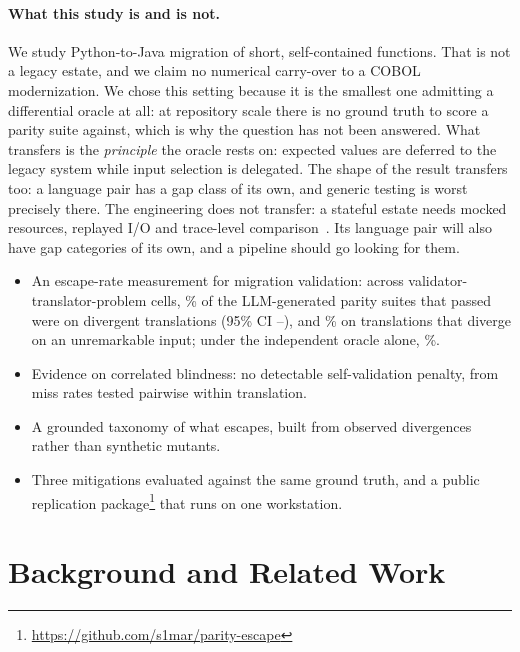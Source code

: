 \documentclass[sigconf]{acmart}
\begin{document}
\paragraph{What this study is and is not.}
We study Python-to-Java migration of short, self-contained functions. That is not a legacy
estate, and we claim no numerical carry-over to a COBOL modernization. We chose this setting
because it is the smallest one admitting a differential oracle at all: at repository scale
there is no ground truth to score a parity suite against, which is why the question has not
been answered. What transfers is the \emph{principle} the oracle rests on:
expected values are deferred to the legacy system while input selection is delegated. The
shape of the result transfers too: a language pair has a gap class of its own, and generic
testing is worst precisely there. The engineering does not transfer: a stateful estate needs
mocked resources, replayed I/O and trace-level
comparison~\cite{kumar2024validation,ferenczi2026locksmith}. Its language pair will also have
gap categories of its own, and a pipeline should go looking for them.

\vspace{-1ex}
{\setlength{\itemsep}{0pt}\setlength{\parsep}{0pt}
\begin{itemize}
\item An escape-rate measurement for migration validation: across \NCells{}
      validator-translator-problem cells, \EscapeRate\% of the LLM-generated parity suites
      that passed were on divergent translations (95\% CI \EscapeLo--\EscapeHi), and
      \EscapeOrdinary\% on translations that diverge on an unremarkable input; under the
      independent oracle alone, \EscapeOracleOnly\%.
\item Evidence on correlated blindness: no detectable self-validation penalty, from miss
      rates tested pairwise within translation.
\item A grounded taxonomy of what escapes, built from observed divergences rather than
      synthetic mutants.
\item Three mitigations evaluated against the same ground truth, and a public replication
      package\footnote{\url{https://github.com/s1mar/parity-escape}} that runs on one
      workstation.
\end{itemize}}

\section{Background and Related Work}
\end{document}
